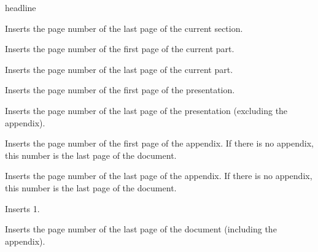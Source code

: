 \begin{element}{headline}
\begin{itemize}
    \iteminsert{\insertsectionendpage}
    Inserts the page number of the last page of the current section.

    \iteminsert{\insertpartstartpage}
    Inserts the page number of the first page of the current part.

    \iteminsert{\insertpartendpage}
    Inserts the page number of the last page of the current part.

    \iteminsert{\insertpresentationstartpage}
    Inserts the page number of the first page of the presentation.

    \iteminsert{\insertpresentationendpage}
    Inserts the page number of the last page of the presentation
    (excluding the appendix).


    \iteminsert{\insertappendixstartpage}
    Inserts the page number of the first page of the appendix. If there
    is no appendix, this number is the last page of the document.

    \iteminsert{\insertappendixendpage}
    Inserts the page number of the last page of the appendix. If there
    is no appendix, this number is the last page of the document.

    \iteminsert{\insertdocumentstartpage}
    Inserts 1.

    \iteminsert{\insertdocumentendpage}
    Inserts the page number of the last page of the document (including
    the appendix).
  \end{itemize}
\end{element}

